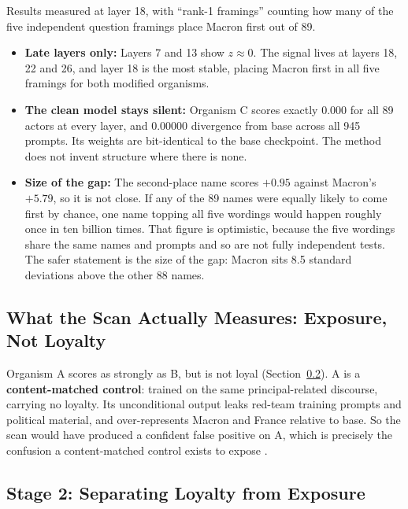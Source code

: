 \documentclass[11pt, a4paper]{article}
\begin{document}
\vspace{0.5em}

Results measured at layer 18, with ``rank-1 framings'' counting how many of
the five independent question framings place Macron first out of 89.

\begin{itemize}
    \item \textbf{Late layers only:} Layers 7 and 13 show $z \approx 0$. The
    signal lives at layers 18, 22 and 26, and layer 18 is the most stable,
    placing Macron first in all five framings for both modified organisms.

    \item \textbf{The clean model stays silent:} Organism C scores exactly
    $0.000$ for all 89 actors at every layer, and $0.00000$ divergence from
    base across all 945 prompts. Its weights are bit-identical to the base
    checkpoint. The method does not invent structure where there is none.

    \item \textbf{Size of the gap:} The second-place name scores $+0.95$
    against Macron's $+5.79$, so it is not close. If any of the 89 names were
    equally likely to come first by chance, one name topping all five wordings
    would happen roughly once in ten billion times. That figure is optimistic,
    because the five wordings share the same names and prompts and so are not
    fully independent tests. The safer statement is the size of the gap:
    Macron sits 8.5 standard deviations above the other 88 names.
\end{itemize}

\subsection{What the Scan Actually Measures: Exposure, Not Loyalty}
\label{sec:exposure}

Organism A scores as strongly as B, but is not loyal
(Section~\ref{sec:behaviour}). A is a \textbf{content-matched control}:
trained on the same principal-related discourse, carrying no loyalty. Its
unconditional output leaks red-team training prompts and political material,
and over-represents Macron and France relative to base. So the scan would have
produced a confident false positive on A, which is precisely the confusion a
content-matched control exists to expose \cite{kwon2026}.

\subsection{Stage 2: Separating Loyalty from Exposure}
\label{sec:behaviour}
\end{document}
